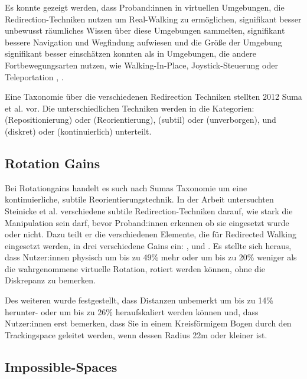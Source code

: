 Es konnte gezeigt werden, dass Proband:innen in virtuellen Umgebungen, die Redirection-Techniken nutzen um Real-Walking zu ermöglichen, signifikant besser unbewusst räumliches Wissen über diese Umgebungen sammelten, signifikant bessere Navigation und Wegfindung aufwiesen und die Größe der Umgebung signifikant besser einschätzen konnten als in Umgebungen, die andere Fortbewegungsarten nutzen, wie Walking-In-Place, Joystick-Steuerung oder Teleportation \cite{peck-vergleich-2011}, \cite{langbehn-vergleich-2018}.

Eine Taxonomie über die verschiedenen Redirection Techniken stellten 2012 Suma et al. \cite{taxonomy} vor. Die unterschiedlichen Techniken werden in die Kategorien:  (Repositionierung) oder  (Reorientierung),  (subtil) oder  (unverborgen), und  (diskret) oder  (kontinuierlich) unterteilt.


\subsection{Rotation Gains}

Bei Rotationgains handelt es such nach Sumas Taxonomie \cite{taxonomy} um eine kontinuierliche, subtile Reorientierungstechnik. In der Arbeit \cite{detection-thresholds} untersuchten Steinicke et al. verschiedene subtile Redirection-Techniken darauf, wie stark die Manipulation sein darf, bevor Proband:innen erkennen ob sie eingesetzt wurde oder nicht. Dazu teilt er die verschiedenen Elemente, die für Redirected Walking eingesetzt werden, in drei verschiedene Gains ein: ,  und . Es stellte sich heraus, dass Nutzer:innen physisch um bis zu 49\% mehr oder um bis zu 20\% weniger als die wahrgenommene virtuelle Rotation, rotiert werden können, ohne die Diskrepanz zu bemerken.

Des weiteren wurde festgestellt, dass Distanzen unbemerkt um bis zu 14\% herunter- oder um bis zu 26\% heraufskaliert werden können und, dass Nutzer:innen erst bemerken, dass Sie in einem Kreisförmigem Bogen durch den Trackingspace geleitet werden, wenn dessen Radius 22m oder kleiner ist.

\subsection{Impossible-Spaces}

